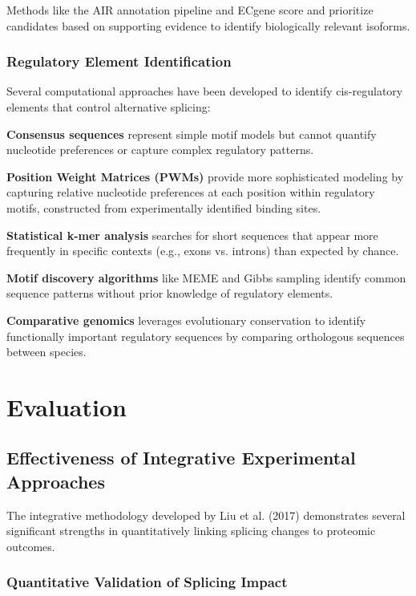 \documentclass[12pt,a4paper]{article}
\begin{document}
Methods like the AIR annotation pipeline and ECgene score and prioritize candidates based on supporting evidence to identify biologically relevant isoforms.

\subsubsection{Regulatory Element Identification}

Several computational approaches have been developed to identify cis-regulatory elements that control alternative splicing:

\textbf{Consensus sequences} represent simple motif models but cannot quantify nucleotide preferences or capture complex regulatory patterns.

\textbf{Position Weight Matrices (PWMs)} provide more sophisticated modeling by capturing relative nucleotide preferences at each position within regulatory motifs, constructed from experimentally identified binding sites.

\textbf{Statistical k-mer analysis} searches for short sequences that appear more frequently in specific contexts (e.g., exons vs. introns) than expected by chance.

\textbf{Motif discovery algorithms} like MEME and Gibbs sampling identify common sequence patterns without prior knowledge of regulatory elements.

\textbf{Comparative genomics} leverages evolutionary conservation to identify functionally important regulatory sequences by comparing orthologous sequences between species.

\section{Evaluation}

\subsection{Effectiveness of Integrative Experimental Approaches}

The integrative methodology developed by Liu et al. (2017) demonstrates several significant strengths in quantitatively linking splicing changes to proteomic outcomes.

\subsubsection{Quantitative Validation of Splicing Impact}
\end{document}
